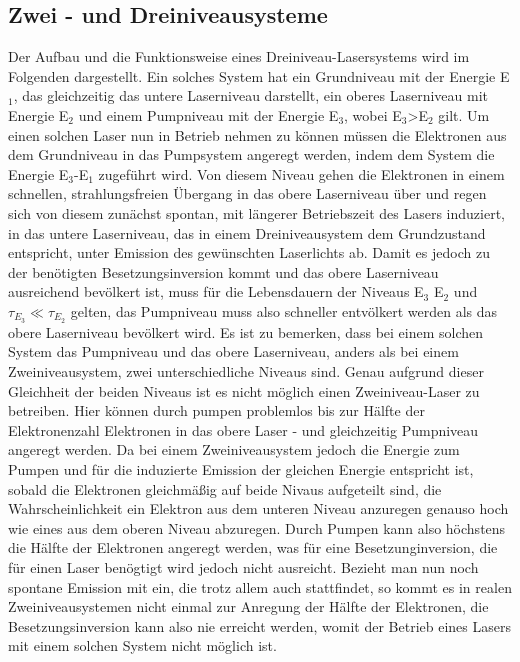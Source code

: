 \subsection{Zwei - und Dreiniveausysteme}
Der Aufbau und die Funktionsweise eines Dreiniveau-Lasersystems wird im Folgenden dargestellt. \newline
Ein solches System hat ein Grundniveau mit der Energie E$_1$, das gleichzeitig das untere Laserniveau darstellt, ein oberes Laserniveau mit Energie E$_2$ und einem Pumpniveau mit der Energie E$_3$, wobei E$_3$>E$_2$ gilt. \newline
Um einen solchen Laser nun in Betrieb nehmen zu können müssen die Elektronen aus dem Grundniveau in das Pumpsystem angeregt werden, indem dem System die Energie E$_3$-E$_1$ zugeführt wird. Von diesem Niveau gehen die Elektronen in einem schnellen, strahlungsfreien Übergang in das obere Laserniveau über und regen sich von diesem zunächst spontan, mit längerer Betriebszeit des Lasers induziert, in das untere Laserniveau, das in einem Dreiniveausystem dem Grundzustand entspricht, unter Emission des gewünschten Laserlichts ab. Damit es jedoch zu der benötigten Besetzungsinversion kommt und das obere Laserniveau ausreichend bevölkert ist, muss für die Lebensdauern der Niveaus E$_3$ E$_2$ und $\tau_{E_3} \ll\tau_{E_2}$ gelten, das Pumpniveau muss also schneller entvölkert werden als das obere Laserniveau bevölkert wird. \newline
Es ist zu bemerken, dass bei einem solchen System das Pumpniveau und das obere Laserniveau, anders als bei einem Zweiniveausystem, zwei unterschiedliche Niveaus sind. Genau aufgrund dieser Gleichheit der beiden Niveaus ist es nicht möglich einen Zweiniveau-Laser zu betreiben. Hier können durch pumpen problemlos bis zur Hälfte der Elektronenzahl Elektronen in das obere Laser - und gleichzeitig Pumpniveau angeregt werden. Da bei einem Zweiniveausystem jedoch die Energie zum Pumpen und für die induzierte Emission der gleichen Energie entspricht ist, sobald die Elektronen gleichmäßig auf beide Nivaus aufgeteilt sind, die Wahrscheinlichkeit ein Elektron aus dem unteren Niveau anzuregen genauso hoch wie eines aus dem oberen Niveau abzuregen. Durch Pumpen kann also höchstens die Hälfte der Elektronen angeregt werden, was für eine Besetzunginversion, die für einen Laser benögtigt wird jedoch nicht ausreicht. Bezieht man nun noch spontane Emission mit ein, die trotz allem auch stattfindet, so kommt es in realen Zweiniveausystemen nicht einmal zur Anregung der Hälfte der Elektronen, die Besetzungsinversion kann also nie erreicht werden, womit der Betrieb eines Lasers mit einem solchen System nicht möglich ist.
